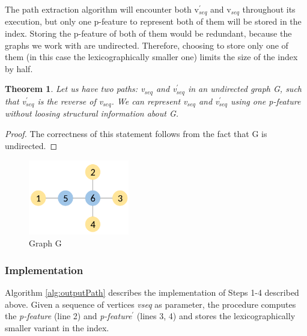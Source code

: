 \documentclass{l4proj}
\newtheorem{theorem}{Theorem}[section]
\begin{document}
The path extraction algorithm will encounter both v$_{seq}^{\prime}$ and v$_{seq}$ throughout its execution, but only one p-feature to represent both of them will be stored in the index. Storing the p-feature of both of them would be redundant, because the graphs we work with are undirected. Therefore, choosing to store only one of them (in this case the lexicographically smaller one) limits the size of the index by half.

\begin{theorem}
Let us have two paths: v$_{seq}$ and v$_{seq}^{\prime}$ in an undirected graph G, such that v$_{seq}^{\prime}$ is the reverse of v$_{seq}$. We can represent v$_{seq}$ and v$_{seq}^{\prime}$ using one p-feature without loosing structural information about G. 
\end{theorem}

\begin{proof}
The correctness of this statement follows from the fact that G is undirected. 
\end{proof}

\begin{figure}
\centering
\begin{minipage}[t]{.5\textwidth}
  \centering
  \includegraphics[height=3.3cm,width=4.4cm]{images/graphs/C2H4-1.png}
  \caption{Graph G}
  \label{C2H4-1}
\end{minipage}
\end{figure}

\subsubsection{Implementation}
\label{pi:featuresImpl}
Algorithm \ref{alg:outputPath} describes the implementation of Steps 1-4 described above. Given a sequence of vertices \emph{vseq} as parameter, the procedure computes the \emph{p-feature} (line 2) and \emph{p-feature}$^{\prime}$ (lines 3, 4) and stores the lexicographically smaller variant in the index.
\end{document}
